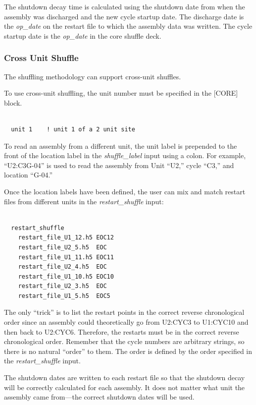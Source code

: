 The shutdown decay time is calculated using the shutdown date from when the assembly was discharged
and the new cycle startup date. The discharge date is the {\it op\_date} on the restart file to which
the assembly data was written.
The cycle startup date is the {\it op\_date} in the core shuffle deck.

\subsubsection{Cross Unit Shuffle}

The shuffling methodology can support cross-unit shuffles.

To use cross-unit shuffling, the unit number must be specified in the [CORE] block.
\begin{Verbatim}[fontsize=\small]

  unit 1    ! unit 1 of a 2 unit site

\end{Verbatim}

To read an assembly from a different unit, the unit label is prepended to the front of the location label
in the {\it shuffle\_label} input using a colon.
For example, ``U2:C3G-04'' is used to read the assembly from Unit ``U2,'' cycle ``C3,'' and location ``G-04.''

Once the location labels have been defined, the user can mix and match restart files from different units
in the {\it restart\_shuffle} input:
\begin{Verbatim}[fontsize=\small]

  restart_shuffle
    restart_file_U1_12.h5 EOC12
    restart_file_U2_5.h5  EOC
    restart_file_U1_11.h5 EOC11
    restart_file_U2_4.h5  EOC
    restart_file_U1_10.h5 EOC10
    restart_file_U2_3.h5  EOC
    restart_file_U1_5.h5  EOC5

\end{Verbatim}
The only ``trick'' is to list the restart points in the correct reverse chronological order since an
assembly could theoretically go from U2:CYC3 to U1:CYC10 and then back to U2:CYC6. Therefore, the restarts
must be in the correct reverse chronological order. Remember that the cycle numbers are arbitrary strings,
so there is no natural ``order'' to them. The order is defined by the order specified in the
{\it restart\_shuffle} input.

The shutdown dates are written to each restart file so that the shutdown decay will be correctly
calculated for each assembly.
It does not matter what unit the assembly came from---the correct shutdown dates will be used.

